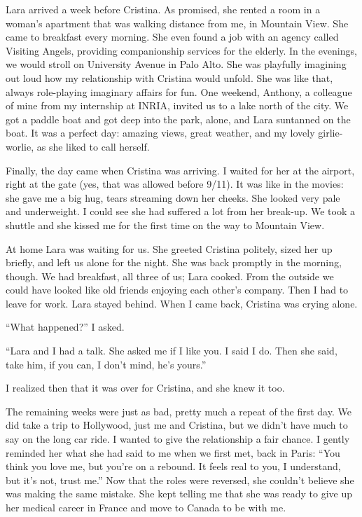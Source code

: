 \documentclass[12pt]{book}
\begin{document}
Lara arrived a week before Cristina. As promised, she rented a room in a
woman's apartment that was walking distance from me, in Mountain View.
She came to breakfast every morning. She even found a job with an agency
called Visiting Angels, providing companionship services for the
elderly. In the evenings, we would stroll on University Avenue in Palo
Alto. She was playfully imagining out loud how my relationship with
Cristina would unfold. She was like that, always role-playing imaginary
affairs for fun. One weekend, Anthony, a colleague of mine from my
internship at INRIA, invited us to a lake north of the city. We got a
paddle boat and got deep into the park, alone, and Lara suntanned on the
boat. It was a perfect day: amazing views, great weather, and my lovely
girlie-worlie, as she liked to call herself.

Finally, the day came when Cristina was arriving. I waited for her at
the airport, right at the gate (yes, that was allowed before 9/11). It
was like in the movies: she gave me a big hug, tears streaming down her
cheeks. She looked very pale and underweight. I could see she had
suffered a lot from her break-up. We took a shuttle and she kissed me
for the first time on the way to Mountain View.

At home Lara was waiting for us. She greeted Cristina politely, sized
her up briefly, and left us alone for the night. She was back promptly
in the morning, though. We had breakfast, all three of us; Lara cooked.
From the outside we could have looked like old friends enjoying each
other's company. Then I had to leave for work. Lara stayed behind. When
I came back, Cristina was crying alone.

``What happened?'' I asked.

``Lara and I had a talk. She asked me if I like you. I said I do. Then
she said, take him, if you can, I don't mind, he's yours.''

I realized then that it was over for Cristina, and she knew it too.

The remaining weeks were just as bad, pretty much a repeat of the first
day. We did take a trip to Hollywood, just me and Cristina, but we
didn't have much to say on the long car ride. I wanted to give the
relationship a fair chance. I gently reminded her what she had said to
me when we first met, back in Paris: ``You think you love me, but you're
on a rebound. It feels real to you, I understand, but it's not, trust
me.'' Now that the roles were reversed, she couldn't believe she was
making the same mistake. She kept telling me that she was ready to give
up her medical career in France and move to Canada to be with me.
\end{document}
